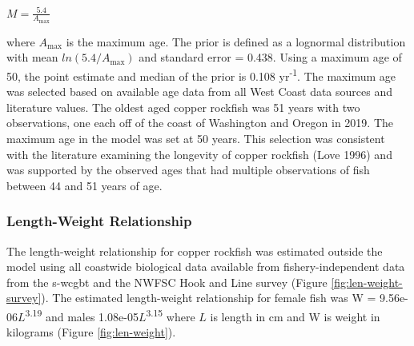 \documentclass[11pt,
  english,
  a4paper,
]{article}
\begin{document}
\leavevmode\tagmcend\tagstructend\par

\begin{centering}

$M=\frac{5.4}{A_{\text{max}}}$

\end{centering}

\vspace{0.5cm}


where {\(A_{\text{max}}\)\leavevmode\tagmcend\tagstructend} is the maximum age. The prior is defined as a lognormal distribution with mean {\(ln(5.4/A_{\text{max}})\)\leavevmode\tagmcend\tagstructend} and standard error = 0.438. Using a maximum age of 50, the point estimate and median of the prior is 0.108 yr\textsuperscript{-1}. The maximum age was selected based on available age data from all West Coast data sources and literature values. The oldest aged copper rockfish was 51 years with two observations, one each off of the coast of Washington and Oregon in 2019. The maximum age in the model was set at 50 years. This selection was consistent with the literature examining the longevity of copper rockfish {(Love 1996)\leavevmode\tagmcend\tagstructend} and was supported by the observed ages that had multiple observations of fish between 44 and 51 years of age.

\leavevmode\tagmcend\tagstructend\par


\hypertarget{length-weight-relationship}{%
\subsubsection{Length-Weight Relationship}\label{length-weight-relationship}}

\leavevmode\tagmcend\tagstructend


The length-weight relationship for copper rockfish was estimated outside the model using all coastwide biological data available from fishery-independent data from the \gls{s-wcgbt} and the NWFSC Hook and Line survey (Figure \ref{fig:len-weight-survey}). The estimated length-weight relationship for female fish was W = 9.56e-06{\(L\)\leavevmode\tagmcend\tagstructend}\textsuperscript{3.19} and males 1.08e-05{\(L\)\leavevmode\tagmcend\tagstructend}\textsuperscript{3.15} where {\(L\)\leavevmode\tagmcend\tagstructend} is length in cm and W is weight in kilograms (Figure \ref{fig:len-weight}).
\end{document}
